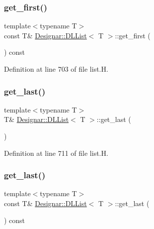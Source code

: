 \subsubsection{\texorpdfstring{get\+\_\+first()}{get\_first()}\hspace{0.1cm}{\footnotesize\ttfamily [2/2]}}
{\footnotesize\ttfamily template$<$typename T$>$ \\
const T\& \hyperlink{class_designar_1_1_d_l_list}{Designar\+::\+D\+L\+List}$<$ T $>$\+::get\+\_\+first (\begin{DoxyParamCaption}{ }\end{DoxyParamCaption}) const\hspace{0.3cm}{\ttfamily [inline]}}



Definition at line 703 of file list.\+H.

\mbox{\label{class_designar_1_1_d_l_list_a94c9be82f4ec5a3579e84027c421e073}} 
\subsubsection{\texorpdfstring{get\+\_\+last()}{get\_last()}\hspace{0.1cm}{\footnotesize\ttfamily [1/2]}}
{\footnotesize\ttfamily template$<$typename T$>$ \\
T\& \hyperlink{class_designar_1_1_d_l_list}{Designar\+::\+D\+L\+List}$<$ T $>$\+::get\+\_\+last (\begin{DoxyParamCaption}{ }\end{DoxyParamCaption})\hspace{0.3cm}{\ttfamily [inline]}}



Definition at line 711 of file list.\+H.

\mbox{\label{class_designar_1_1_d_l_list_aae2cd78c744f82ece725c9d21a02d4da}} 
\subsubsection{\texorpdfstring{get\+\_\+last()}{get\_last()}\hspace{0.1cm}{\footnotesize\ttfamily [2/2]}}
{\footnotesize\ttfamily template$<$typename T$>$ \\
const T\& \hyperlink{class_designar_1_1_d_l_list}{Designar\+::\+D\+L\+List}$<$ T $>$\+::get\+\_\+last (\begin{DoxyParamCaption}{ }\end{DoxyParamCaption}) const\hspace{0.3cm}{\ttfamily [inline]}}



